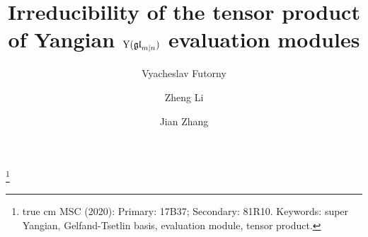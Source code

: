 \documentclass[12pt]{amsart}
\begin{document}
	
\newcommand{\bal}{\begin{aligned}}
\newcommand{\eal}{\end{aligned}}
\newcommand{\beq}{\begin{equation}}
\newcommand{\eeq}{\end{equation}}
\newcommand{\ben}{\begin{equation*}}
\newcommand{\een}{\end{equation*}}
	
\newcommand{\bpf}{\begin{proof}}
\newcommand{\epf}{\end{proof}}
	
	

\newcommand{\Gaff}{\widehat{\mathfrak{g}}}   %
\newcommand{\Gafft}{\widehat{\mathfrak{g}'}} %
\newcommand{\Glop}{L\mathfrak{g}}            %
\newcommand{\Hlie}{\mathfrak{h}}             %
\newcommand{\YB}{\mathcal{YB}}               %
\newcommand{\CF}{\mathcal{F}}                %
\newcommand{\CR}{\textbf{R}}                 %
\newcommand{\BC}{\mathbb{C}}            %
\newcommand{\BZ}{\mathbb{Z}}            %
\newcommand{\Id}{\textrm{Id}}            %
\newcommand{\CB}{\mathcal{B}}            %
\newcommand{\Sm}{\mathbb{S}}             %
\newcommand{\Rc}{\mathcal{R}}
\newcommand{\xiL}{\xi^{}_{\La}}
\newcommand{\xiLo}{\xi^{}_{\La^0}}
\newcommand{\etaL}{\eta^{}_{\La}}
\newcommand{\etaLo}{\eta^{}_{\La^0}}
\newcommand{\pa}[1]{\overline{#1}}	
	
\def\beql#1{\begin{equation}\label{#1}}
		
\title{Irreducibility of the tensor product of Yangian ${\rm Y}(\mathfrak{gl}_{m|n})$ evaluation modules}
		
\author{Vyacheslav Futorny}
\address{Shenzhen International Center for Mathematics, Southern University of Science and Technology, Shenzhen, China}
\author{Zheng Li}
\address{School of Artificial Intelligence, Jianghan University, Wuhan, Hubei 430056, China}
\author{Jian Zhang}
\address{School of Mathematics and Statistics,  Central China Normal University, Wuhan, Hubei 430079, China}

\thanks{{\scriptsize
{} true cm MSC (2020): Primary: 17B37; Secondary: 81R10.
\newline Keywords: super Yangian, Gelfand-Tsetlin basis, evaluation module, tensor product.		
}}
		
\end{document}
